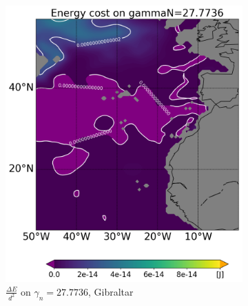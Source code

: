 \begin{figure}[htbp]
\begin{subfigure}[b]{0.4\textwidth}
         \includegraphics[width=\textwidth]{plots/energy/gibraltar_energy/Map2dcyl_energy_on_gammaN_2777e-2_reg310Eto360E05Nto57N_1990to1998av_WOCE.png}
         \caption{$\frac{\Delta E}{d^2}$ on $\gamma_n = 27.7736$, Gibraltar}
         \label{fig:subplot_gibraltar_energy_gamma_n}
     \end{subfigure}
     \hfill
      \begin{subfigure}[b]{0.4\textwidth}
         

\end{subfigure}
\end{figure}

